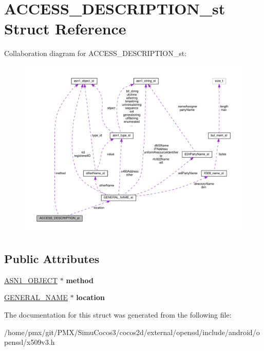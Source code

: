 \hypertarget{structACCESS__DESCRIPTION__st}{}\section{A\+C\+C\+E\+S\+S\+\_\+\+D\+E\+S\+C\+R\+I\+P\+T\+I\+O\+N\+\_\+st Struct Reference}
\label{structACCESS__DESCRIPTION__st}


Collaboration diagram for A\+C\+C\+E\+S\+S\+\_\+\+D\+E\+S\+C\+R\+I\+P\+T\+I\+O\+N\+\_\+st\+:
\nopagebreak
\begin{figure}[H]
\begin{center}
\leavevmode
\includegraphics[width=350pt]{structACCESS__DESCRIPTION__st__coll__graph}
\end{center}
\end{figure}
\subsection*{Public Attributes}
\begin{DoxyCompactItemize}
\item 
\mbox{\label{structACCESS__DESCRIPTION__st_a1c2581bb4d0f62fb5861de5176dfe015}} 
\hyperlink{structasn1__object__st}{A\+S\+N1\+\_\+\+O\+B\+J\+E\+CT} $\ast$ {\bfseries method}
\item 
\mbox{\label{structACCESS__DESCRIPTION__st_a997d23846637f8c581f7ad538521ca2d}} 
\hyperlink{structGENERAL__NAME__st}{G\+E\+N\+E\+R\+A\+L\+\_\+\+N\+A\+ME} $\ast$ {\bfseries location}
\end{DoxyCompactItemize}


The documentation for this struct was generated from the following file\+:\begin{DoxyCompactItemize}
\item 
/home/pmx/git/\+P\+M\+X/\+Simu\+Cocos3/cocos2d/external/openssl/include/android/openssl/x509v3.\+h\end{DoxyCompactItemize}
